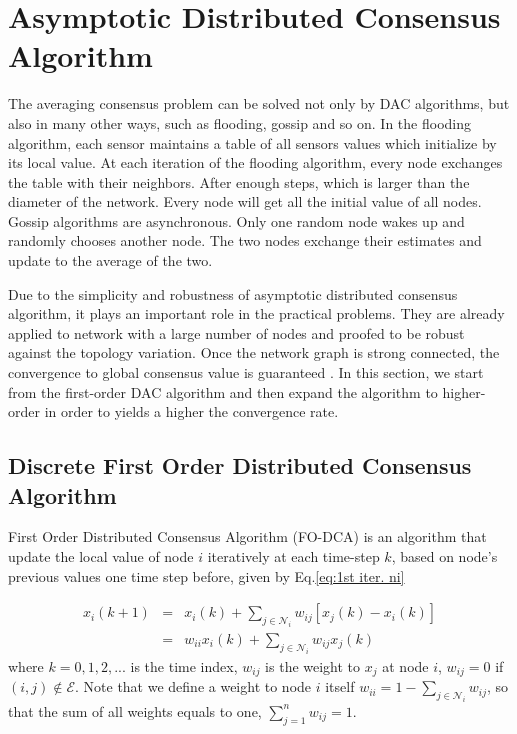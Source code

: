 
\section{Asymptotic Distributed Consensus Algorithm}

The averaging consensus problem can be solved not only by DAC algorithms,
but also in many other ways, such as flooding, gossip and so on. In
the flooding algorithm, each sensor maintains a table of all sensors
values which initialize by its local value. At each iteration of the
flooding algorithm, every node exchanges the table with their neighbors.
After enough steps, which is larger than the diameter of the network.
Every node will get all the initial value of all nodes. Gossip algorithms
are asynchronous. Only one random node wakes up and randomly chooses
another node. The two nodes exchange their estimates and update to
the average of the two. 

Due to the simplicity and robustness of asymptotic distributed consensus
algorithm, it plays an important role in the practical problems. They
are already applied to network with a large number of nodes and proofed
to be robust against the topology variation. Once the network graph
is strong connected, the convergence to global consensus value is
guaranteed \cite{Ren2007}. In this section, we start from the first-order
DAC algorithm and then expand the algorithm to higher-order in order
to yields a higher the convergence rate.


\subsection{\label{sub:DT-First-Order-DAC}Discrete First Order Distributed Consensus
Algorithm}

First Order Distributed Consensus Algorithm (FO-DCA) is an algorithm
that update the local value of node $i$ iteratively at each time-step
$k$, based on node\textquoteright{}s previous values one time step
before, given by Eq.\eqref{eq:1st iter. ni}

\begin{eqnarray}
x_{i}(k+1) & = & x_{i}(k)+\sum_{j\in\mathcal{N}_{i}}w_{ij}\left[x_{j}(k)-x_{i}(k)\right]\label{eq:1st iter. ni}\\
 & = & w_{ii}x_{i}(k)+\sum_{j\in\mathcal{N}_{i}}w_{ij}x_{j}(k)
\end{eqnarray}
where $k=0,1,2,...$ is the time index, $w_{ij}$ is the weight to
$x_{j}$ at node $i$, $w_{ij}=0$ if $(i,j)\notin\mathcal{E}$. Note
that we define a weight to node $i$ itself $w_{ii}=1-\sum_{j\in\mathcal{N}_{i}}w_{ij}$,
so that the sum of all weights equals to one, $\sum_{j=1}^{n}w_{ij}=1$. 

